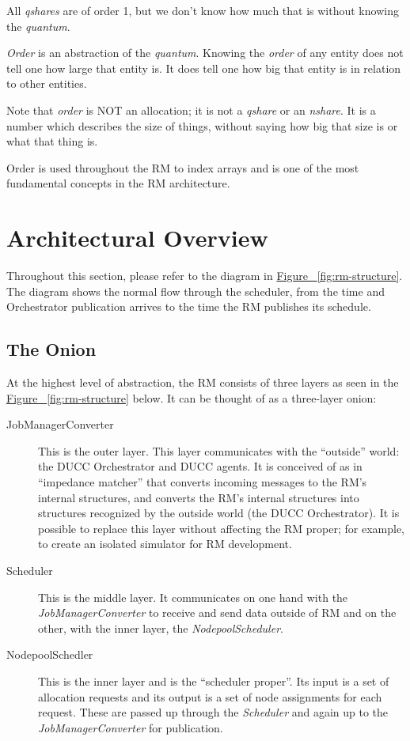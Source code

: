 \begin{description}
        All {\em qshares} are of order 1, but we don't know how much that is without knowing
        the {\em quantum}.  

        {\em Order} is an abstraction of the {\em quantum}.  Knowing the {\em order}
        of any entity does not tell one how large that entity is.  It does tell one
        how big that entity is in relation to other entities.

        Note that {\em order} is NOT an allocation; it is not a {\em qshare} or an {\em nshare}.
        It is a number which describes the size of things, without saying how big that size
        is or what that thing is.

        Order is used throughout the RM to index arrays and is one of the most fundamental
        concepts in the RM architecture.
      \end{description}
      
\section{Architectural Overview}
    Throughout this section, please refer to the diagram in \hyperref[fig:rm-structure]{Figure ~\ref{fig:rm-structure}}.
    The diagram shows the normal flow through the scheduler, from the time and Orchestrator
    publication arrives to the time the RM publishes its schedule.

\subsection{The Onion}
    At the highest level of abstraction, the RM consists of three layers as seen in the 
    \hyperref[fig:rm-structure]{Figure ~\ref{fig:rm-structure}} below.  It can be thought of as a three-layer onion:
    \begin{description}
    \item[JobManagerConverter] This is the outer layer.  This layer communicates with the
      ``outside'' world: the DUCC Orchestrator and DUCC agents.  It is conceived of as in
      ``impedance matcher'' that converts incoming messages to the RM's internal structures, and
      converts the RM's internal structures into structures recognized by the outside world (the
      DUCC Orchestrator). It is possible to replace this layer without affecting the RM proper; for
      example, to create an isolated simulator for RM development.
    \item[Scheduler] This is the middle layer.  It communicates on one hand with the {\em JobManagerConverter}
      to receive and send data outside of RM and on the other, with the inner layer, the {\em NodepoolScheduler}.
     \item[NodepoolSchedler] This is the inner layer and is the ``scheduler proper''.  Its input is
       a set of allocation requests and its output is a set of node assignments for each request.  These are
       passed up through the {\em Scheduler} and again up to the {\em JobManagerConverter} for publication.
    \end{description}
    
